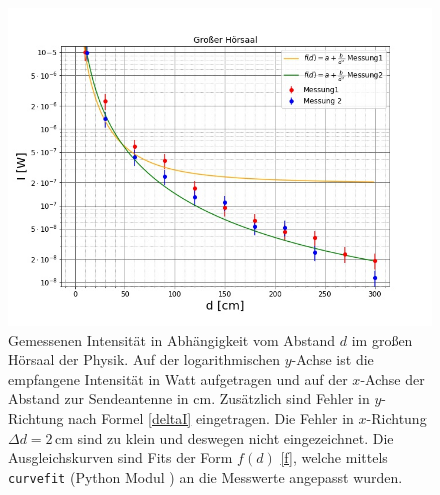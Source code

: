 \documentclass[titlepage,11pt,a4paper,ngerman]{article}
\begin{document}
\begin{figure}[ht]
	\includegraphics[scale=0.55]{Bilder/Abstand-GrH.jpg}
	\centering
	\caption{Gemessenen Intensität in Abhängigkeit vom Abstand $d$ im großen Hörsaal der Physik. Auf der logarithmischen $y$-Achse ist die empfangene Intensität in Watt aufgetragen und auf der $x$-Achse der Abstand zur Sendeantenne in cm. Zusätzlich sind Fehler in $y$-Richtung nach Formel \eqref{deltaI} eingetragen. Die Fehler in $x$-Richtung $\Delta d = 2\,$cm sind zu klein und deswegen nicht eingezeichnet. Die Ausgleichskurven sind Fits der Form $f(d)$ \eqref{f}, welche mittels \texttt{curvefit} (Python Modul \cite{curvescipy}) an die Messwerte angepasst wurden.}
	\label{GrH-A}
\end{figure}
\end{document}
